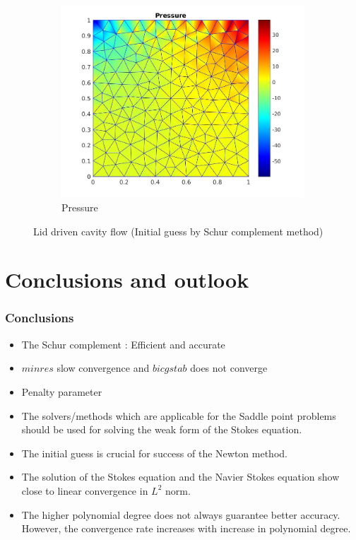 \documentclass{beamer}
\begin{document}
\begin{frame}
\begin{figure}
\begin{subfigure}{0.3\textwidth}
    \includegraphics[width=\linewidth]{lid_newton_pressure_schur.jpg}
    \caption{Pressure}
  \label{pressure_navier_stoke_schur_lid}
  \end{subfigure}
\caption{Lid driven cavity flow (Initial guess by Schur complement method)}
\label{lid_driven_cavity_n_s_schur}
\end{figure}
\end{frame}
\section{Conclusions and outlook}
\begin{frame}
\frametitle{Conclusions}
\begin{itemize}

\item The Schur complement : Efficient and accurate
\item $minres$ slow convergence and $bicgstab$ does not converge
\item Penalty parameter
\item The solvers/methods which are applicable for the Saddle point problems should be used for solving the weak form of the Stokes equation.
\item The initial guess is crucial for success of the Newton method.
\item The solution of the Stokes equation and the Navier Stokes equation show close to linear convergence in $L^2$ norm.
\item The higher polynomial degree does not always guarantee better accuracy. However, the convergence rate increases with increase in polynomial degree.

\end{itemize}


\end{frame}
\end{document}
